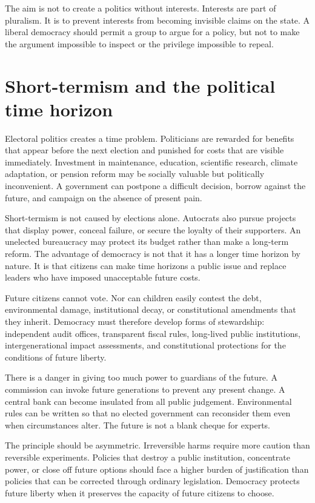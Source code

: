 ﻿\documentclass[12pt,a4paper]{book}
\begin{document}
The aim is not to create a politics without interests.  Interests are part
of pluralism.  It is to prevent interests from becoming invisible claims on
the state.  A liberal democracy should permit a group to argue for a policy,
but not to make the argument impossible to inspect or the privilege
impossible to repeal.

\section{Short-termism and the political time horizon}

Electoral politics creates a time problem.  Politicians are rewarded for
benefits that appear before the next election and punished for costs that
are visible immediately.  Investment in maintenance, education, scientific
research, climate adaptation, or pension reform may be socially valuable but
politically inconvenient.  A government can postpone a difficult decision,
borrow against the future, and campaign on the absence of present pain.

Short-termism is not caused by elections alone.  Autocrats also pursue
projects that display power, conceal failure, or secure the loyalty of their
supporters.  An unelected bureaucracy may protect its budget rather than
make a long-term reform.  The advantage of democracy is not that it has a
longer time horizon by nature.  It is that citizens can make time horizons a
public issue and replace leaders who have imposed unacceptable future costs.

Future citizens cannot vote.  Nor can children easily contest the debt,
environmental damage, institutional decay, or constitutional amendments
that they inherit.  Democracy must therefore develop forms of stewardship:
independent audit offices, transparent fiscal rules, long-lived public
institutions, intergenerational impact assessments, and constitutional
protections for the conditions of future liberty.

There is a danger in giving too much power to guardians of the future.  A
commission can invoke future generations to prevent any present change.  A
central bank can become insulated from all public judgement.  Environmental
rules can be written so that no elected government can reconsider them even
when circumstances alter.  The future is not a blank cheque for experts.

The principle should be asymmetric.  Irreversible harms require more caution
than reversible experiments.  Policies that destroy a public institution,
concentrate power, or close off future options should face a higher burden
of justification than policies that can be corrected through ordinary
legislation.  Democracy protects future liberty when it preserves the
capacity of future citizens to choose.
\end{document}
